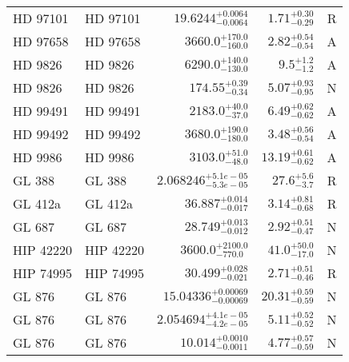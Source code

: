 \begin{longtable*}{llrrr}
HD 97101 & HD 97101 & $19.6244^{+0.0064}_{-0.0064}$ & $1.71^{+0.30}_{-0.29}$ & R \\ 
HD 97658 & HD 97658 & $3660.0^{+170.0}_{-160.0}$ & $2.82^{+0.54}_{-0.54}$ & A \\ 
HD 9826 & HD 9826 & $6290.0^{+140.0}_{-130.0}$ & $9.5^{+1.2}_{-1.2}$ & A \\ 
HD 9826 & HD 9826 & $174.55^{+0.39}_{-0.34}$ & $5.07^{+0.93}_{-0.95}$ & N \\ 
HD 99491 & HD 99491 & $2183.0^{+40.0}_{-37.0}$ & $6.49^{+0.62}_{-0.62}$ & A \\ 
HD 99492 & HD 99492 & $3680.0^{+190.0}_{-180.0}$ & $3.48^{+0.56}_{-0.54}$ & A \\ 
HD 9986 & HD 9986 & $3103.0^{+51.0}_{-48.0}$ & $13.19^{+0.61}_{-0.62}$ & A \\ 
GL 388 & GL 388 & $2.068246^{+5.1e-05}_{-5.3e-05}$ & $27.6^{+5.6}_{-3.7}$ & R \\ 
GL 412a & GL 412a & $36.887^{+0.014}_{-0.017}$ & $3.14^{+0.81}_{-0.68}$ & R \\ 
GL 687 & GL 687 & $28.749^{+0.013}_{-0.012}$ & $2.92^{+0.51}_{-0.47}$ & N \\ 
HIP 42220 & HIP 42220 & $3600.0^{+2100.0}_{-770.0}$ & $41.0^{+50.0}_{-17.0}$ & N \\ 
HIP 74995 & HIP 74995 & $30.499^{+0.028}_{-0.021}$ & $2.71^{+0.51}_{-0.46}$ & R \\ 
GL 876 & GL 876 & $15.04336^{+0.00069}_{-0.00069}$ & $20.31^{+0.59}_{-0.59}$ & N \\ 
GL 876 & GL 876 & $2.054694^{+4.1e-05}_{-4.2e-05}$ & $5.11^{+0.52}_{-0.52}$ & N \\ 
GL 876 & GL 876 & $10.014^{+0.0010}_{-0.0011}$ & $4.77^{+0.57}_{-0.59}$ & N \\ 
\bottomrule 
\end{longtable*} 
